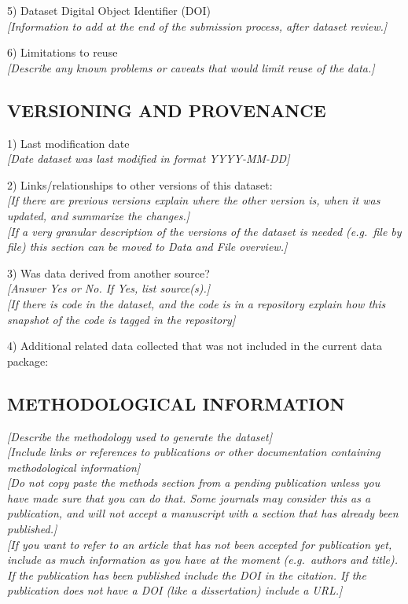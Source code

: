 \documentclass[]{article}
\begin{document}
5) Dataset Digital Object Identifier (DOI)\\
\emph{{[}Information to add at the end of the submission process, after
dataset review.{]}}

6) Limitations to reuse\\
\emph{{[}Describe any known problems or caveats that would limit reuse
of the data.{]}}

\subsection{VERSIONING AND PROVENANCE}\label{versioning-and-provenance}

1) Last modification date\\
\emph{{[}Date dataset was last modified in format YYYY-MM-DD{]}}

2) Links/relationships to other versions of this dataset:\\
\emph{{[}If there are previous versions explain where the other version
is, when it was updated, and summarize the changes.{]}}\\
\emph{{[}If a very granular description of the versions of the dataset
is needed (e.g.~file by file) this section can be moved to Data and File
overview.{]}}

3) Was data derived from another source?\\
\emph{{[}Answer Yes or No. If Yes, list source(s).{]}}\\
\emph{{[}If there is code in the dataset, and the code is in a
repository explain how this snapshot of the code is tagged in the
repository{]}}

4) Additional related data collected that was not included in the
current data package:

\subsection{METHODOLOGICAL
INFORMATION}\label{methodological-information}

\emph{{[}Describe the methodology used to generate the dataset{]}}\\
\emph{{[}Include links or references to publications or other
documentation containing methodological information{]}}\\
\emph{{[}Do not copy paste the methods section from a pending
publication unless you have made sure that you can do that. Some
journals may consider this as a publication, and will not accept a
manuscript with a section that has already been published.{]}}\\
\emph{{[}If you want to refer to an article that has not been accepted
for publication yet, include as much information as you have at the
moment (e.g.~authors and title). If the publication has been published
include the DOI in the citation. If the publication does not have a DOI
(like a dissertation) include a URL.{]}}
\end{document}
